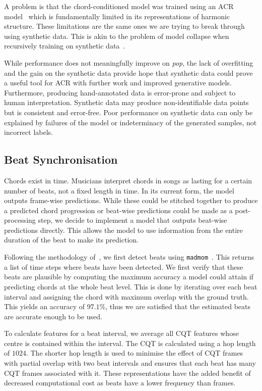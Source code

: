 A problem is that the chord-conditioned model was trained using an ACR model~\cite{BTC} which is fundamentally limited in its representations of harmonic structure. These limitations are the same ones we are trying to break through using synthetic data. This is akin to the problem of model collapse when recursively training on synthetic data~\cite{syntheticcollapse}.

While performance does not meaningfully improve on \emph{pop}, the lack of overfitting and the gain on the synthetic data provide hope that synthetic data could prove a useful tool for ACR with further work and improved generative models. Furthermore, producing hand-annotated data is error-prone and subject to human interpretation. Synthetic data may produce non-identifiable data points but is consistent and error-free. Poor performance on synthetic data can only be explained by failures of the model or indeterminacy of the generated samples, not incorrect labels.


\subsection{Beat Synchronisation}\label{sec:beat-synchronisation}

Chords exist in time. Musicians interpret chords in songs as lasting for a certain number of beats, not a fixed length in time. In its current form, the model outputs frame-wise predictions. While these could be stitched together to produce a predicted chord progression or beat-wise predictions could be made as a post-processing step, we decide to implement a model that outputs beat-wise predictions directly. This allows the model to use information from the entire duration of the beat to make its prediction.

Following the methodology of~\cite{MelodyTranscriptionViaGenerativePreTraining}, we first detect beats using \texttt{madmom}~\cite{madmom}. This returns a list of time steps where beats have been detected. We first verify that these beats are plausible by computing the maximum accuracy a model could attain if predicting chords at the whole beat level. This is done by iterating over each beat interval and assigning the chord with maximum overlap with the ground truth. This yields an accuracy of $97.1\%$, thus we are satisfied that the estimated beats are accurate enough to be used.

To calculate features for a beat interval, we average all CQT features whose centre is contained within the interval. The CQT is calculated using a hop length of $1024$. The shorter hop length is used to minimise the effect of CQT frames with partial overlap with two beat intervals and ensures that each beat has many CQT frames associated with it. These representations have the added benefit of decreased computational cost as beats have a lower frequency than frames.

